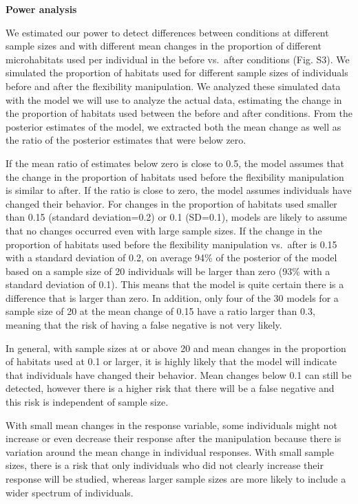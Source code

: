 \documentclass[
]{article}
\begin{document}
\textbf{Power analysis}

We estimated our power to detect differences between conditions at
different sample sizes and with different mean changes in the proportion
of different microhabitats used per individual in the before vs.~after
conditions (Fig. S3). We simulated the proportion of habitats used for
different sample sizes of individuals before and after the flexibility
manipulation. We analyzed these simulated data with the model we will
use to analyze the actual data, estimating the change in the proportion
of habitats used between the before and after conditions. From the
posterior estimates of the model, we extracted both the mean change as
well as the ratio of the posterior estimates that were below zero.

If the mean ratio of estimates below zero is close to 0.5, the model
assumes that the change in the proportion of habitats used before the
flexibility manipulation is similar to after. If the ratio is close to
zero, the model assumes individuals have changed their behavior. For
changes in the proportion of habitats used smaller than 0.15 (standard
deviation=0.2) or 0.1 (SD=0.1), models are likely to assume that no
changes occurred even with large sample sizes. If the change in the
proportion of habitats used before the flexibility manipulation
vs.~after is 0.15 with a standard deviation of 0.2, on average 94\% of
the posterior of the model based on a sample size of 20 individuals will
be larger than zero (93\% with a standard deviation of 0.1). This means
that the model is quite certain there is a difference that is larger
than zero. In addition, only four of the 30 models for a sample size of
20 at the mean change of 0.15 have a ratio larger than 0.3, meaning that
the risk of having a false negative is not very likely.

In general, with sample sizes at or above 20 and mean changes in the
proportion of habitats used at 0.1 or larger, it is highly likely that
the model will indicate that individuals have changed their behavior.
Mean changes below 0.1 can still be detected, however there is a higher
risk that there will be a false negative and this risk is independent of
sample size.

With small mean changes in the response variable, some individuals might
not increase or even decrease their response after the manipulation
because there is variation around the mean change in individual
responses. With small sample sizes, there is a risk that only
individuals who did not clearly increase their response will be studied,
whereas larger sample sizes are more likely to include a wider spectrum
of individuals.
\end{document}

